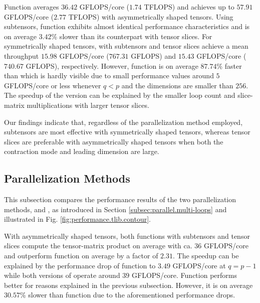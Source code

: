 Function  averages $36.42$ GFLOPS/core ($1.74$ TFLOPS) and achieves up to $57.91$ GFLOPS/core ($2.77$ TFLOPS) with asymmetrically shaped tensors.
Using subtensors, function  exhibits almost identical performance characteristics and is on average $3.42$\% slower than its counterpart with tensor slices.
For symmetrically shaped tensors,  with subtensors and tensor slices achieve a mean throughput $15.98$ GFLOPS/core ($767.31$ GFLOPS) and $15.43$ GFLOPS/core ($740.67$ GFLOPS), respectively.
However, function  is on average $87.74$\% faster than  which is hardly visible due to small performance values around $5$ GFLOPS/core or less whenever $q<p$ and the dimensions are smaller than $256$.
The speedup of the  version can be explained by the smaller loop count and slice-matrix multiplications with larger tensor slices.

Our findings indicate that, regardless of the parallelization method employed, subtensors are most effective with symmetrically shaped tensors, whereas tensor slices are preferable with asymmetrically shaped tensors when both the contraction mode and leading dimension are large.



\subsection{Parallelization Methods}
\label{subsec:results.parallelization-methods}
This subsection compares the performance results of the two parallelization methods,  and , as introduced in Section \ref{subsec:parallel.multi-loops} and illustrated in Fig. \ref{fig:performance.tlib.contour}.

With asymmetrically shaped tensors, both  functions with subtensors and tensor slices compute the tensor-matrix product on average with ca. $36$ GFLOPS/core and outperform function  on average by a factor of $2.31$.
The speedup can be explained by the performance drop of function  to $3.49$ GFLOPS/core at $q=p-1$ while both versions of  operate around $39$ GFLOPS/core.
Function  performs better for reasons explained in the previous subsection.
However, it is on average $30.57$\% slower than function  due to the aforementioned performance drops.

